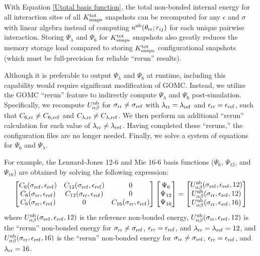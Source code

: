 \documentclass[journal=jced,manuscript=article]{achemso}
\begin{document}
With Equation \ref{Utotal basis function}, the total non-bonded internal energy for all interaction sites of all $K^{\rm tot}_{\rm snaps}$ snapshots can be recomputed for any $\epsilon$ and $\sigma$ with linear algebra instead of computing $u^{\rm nb}(\theta_{\rm rr};r_{ij})$ for each unique pairwise interaction. Storing $\Psi_{\lambda}$ and $\Psi_{6}$ for $K^{\rm tot}_{\rm snaps}$ snapshots also greatly reduces the memory storage load compared to storing $K^{\rm tot}_{\rm snaps}$ configurational snapshots (which must be full-precision for reliable ``rerun'' results). 

Although it is preferable to output $\Psi_{\lambda}$ and $\Psi_{6}$ at runtime, including this capability would require significant modification of GOMC. Instead, we utilize the GOMC ``rerun'' feature to indirectly compute $\Psi_{\lambda}$ and $\Psi_{6}$ post-simulation. Specifically, we recompute $U_{\alpha\beta}^{\rm nb}$ for $\sigma_{\rm rr} \neq \sigma_{\rm ref}$ with $\lambda_{\rm rr} = \lambda_{\rm ref}$ and $\epsilon_{\rm rr} = \epsilon_{\rm ref}$, such that $C_{6\rm{, rr}} \neq C_{6\rm{, ref}}$ and $C_{\lambda \rm{, rr}} \neq C_{\lambda \rm{, ref}}$. We then perform an additional ``rerun'' calculation for each value of $\lambda_{\rm rr} \neq \lambda_{\rm ref}$. Having completed these ``reruns,'' the configuration files are no longer needed. Finally, we solve a system of equations for $\Psi_{6}$ and $\Psi_{\lambda}$. 

For example, the Lennard-Jones 12-6 and Mie 16-6 basis functions ($\Psi_{6}$, $\Psi_{12}$, and $\Psi_{16}$) are obtained by solving the following expression:
\[
\begin{bmatrix}
C_{6}(\sigma_{\rm ref},\epsilon_{\rm ref}) & C_{12}(\sigma_{\rm ref},\epsilon_{\rm ref}) & 0 \\
C_{6}(\sigma_{\rm rr},\epsilon_{\rm ref}) & C_{12}(\sigma_{\rm rr},\epsilon_{\rm ref}) & 0 \\
C_{6}(\sigma_{\rm rr},\epsilon_{\rm ref}) & 0 & C_{16}(\sigma_{\rm rr},\epsilon_{\rm ref})
\end{bmatrix}
\begin{bmatrix}
\Psi_{6} \\
\Psi_{12} \\
\Psi_{16}
\end{bmatrix}
=
\begin{bmatrix}
U_{\alpha\beta}^{\rm nb}(\sigma_{\rm ref},\epsilon_{\rm ref},12) \\
U_{\alpha\beta}^{\rm nb}(\sigma_{\rm rr},\epsilon_{\rm ref},12) \\
U_{\alpha\beta}^{\rm nb}(\sigma_{\rm rr},\epsilon_{\rm ref},16)
\end{bmatrix}
\]
where $U_{\alpha\beta}^{\rm nb}(\sigma_{\rm ref},\epsilon_{\rm ref},12)$ is the reference non-bonded energy, $U_{\alpha\beta}^{\rm nb}(\sigma_{\rm rr},\epsilon_{\rm ref},12)$ is the ``rerun'' non-bonded energy for $\sigma_{\rm rr} \neq \sigma_{\rm ref}$, $\epsilon_{\rm rr} = \epsilon_{\rm ref}$, and $\lambda_{\rm rr} = \lambda_{\rm ref} = 12$, and $U_{\alpha\beta}^{\rm nb}(\sigma_{\rm rr},\epsilon_{\rm ref},16)$ is the ``rerun'' non-bonded energy for $\sigma_{\rm rr} \neq \sigma_{\rm ref}$, $\epsilon_{\rm rr} = \epsilon_{\rm ref}$, and $\lambda_{\rm rr} = 16$.
\end{document}
